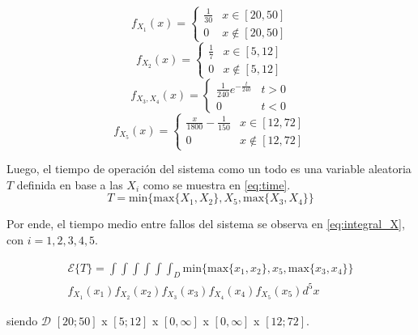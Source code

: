 \documentclass{sig-alternate}
\begin{document}
\begin{equation}
\label{eq:dist_1}
f_{X_1}(x) =
\begin{cases}
\frac{1}{30} & x \in [20,50] \\
0 & x \notin [20, 50]
\end{cases}
\end{equation}
\begin{equation}
\label{eq:dist_2}
f_{X_2}(x) =
\begin{cases}
\frac{1}{7} & x \in [5,12] \\
0 & x \notin [5,12]
\end{cases}
\end{equation}
\begin{equation}
\label{eq:dist_3y4}
f_{X_3, X_4}(x) =
  \begin{cases}
    \frac{1}{240} e^{-\frac{t}{240}} & t > 0 \\
    0 & t < 0
  \end{cases}
\end{equation}
\begin{equation}
\label{eq:dist_5}
f_{X_5}(x) =
\begin{cases}
\frac{x}{1800} - \frac{1}{150} & x \in [12,72] \\
0 & x \notin [12,72]
\end{cases}
\end{equation}

Luego, el tiempo de operaci\'on del sistema como un todo es una variable
aleatoria $T$ definida en base a las $X_i$ como se muestra en \eqref{eq:time}.
\begin{equation}
\label{eq:time}
T = \mathrm{min} \{ \mathrm{max} \{ X_1 , X_2 \}, X_5 , \mathrm{max} \{ X_3 , X_4 \} \}
\end{equation}

Por ende, el tiempo medio entre fallos del sistema se observa en \eqref{eq:integral_X},
con $i=1,2,3,4,5$.

\begin{eqnarray}
\label{eq:integral_X}
\mathcal{E} \{ T \} = \int\int\int\int\int\int_D \mathrm{min} 
\{ \mathrm{max} \{ x_1 , x_2 \}, x_5, \mathrm{max} \{ x_3 , x_4 \} \}
\nonumber
\\
f_{X_1}(x_1) f_{X_2}(x_2) f_{X_3}(x_3) f_{X_4}(x_4) f_{X_5}(x_5) d^5{x}
\end{eqnarray}

siendo $\mathcal{D}$ $[20;50]$ x $[5;12]$ x $[0,\infty]$ x $[0,\infty]$ x $[12;72]$. \\
\end{document}
